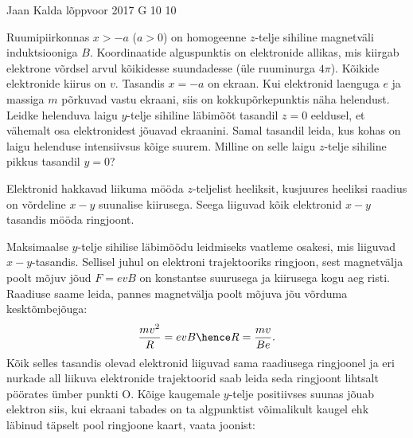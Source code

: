 {Jaan Kalda} %
{lõppvoor} %
{2017} %
{G 10} %
{10} %
{
\ifStatement
Ruumipiirkonnas $x>-a$ ($a>0$) on homogeenne $z$-telje sihiline magnetväli induktsiooniga $B$. 
Koordinaatide alguspunktis on elektronide allikas, mis kiirgab elektrone võrdsel arvul
kõikidesse suundadesse (üle ruuminurga $4\pi$). Kõikide elektronide kiirus on $v$. Tasandis $x=-a$ on ekraan. Kui elektronid 
laenguga $e$ ja massiga $m$ põrkuvad vastu 
ekraani, siis on kokkupõrkepunktis näha helendust. Leidke helenduva laigu $y$-telje sihiline
läbimõõt tasandil $z = 0$ eeldusel, et vähemalt osa elektronidest jõuavad ekraanini.
Samal tasandil leida, kus kohas on laigu helenduse intensiivsus
kõige suurem. Milline on selle laigu $z$-telje sihiline pikkus tasandil $y=0$? 
\fi


\ifHint
Elektronid hakkavad liikuma mööda $z$-teljelist heeliksit, kusjuures heeliksi raadius on võrdeline $x-y$ suunalise kiirusega. Seega liiguvad kõik elektronid $x-y$ tasandis mööda ringjoont.
\fi


\ifSolution
Maksimaalse $y$-telje sihilise läbimõõdu leidmiseks vaatleme osakesi, mis liiguvad $x-y$-tasandis. Sellisel juhul on elektroni trajektooriks ringjoon, sest magnetvälja poolt mõjuv jõud $F=evB$ on konstantse suurusega ja kiirusega kogu aeg risti. Raadiuse saame leida, pannes magnetvälja poolt mõjuva jõu võrduma kesktõmbejõuga:
$$\frac{mv^2}{R}=evB \hence R = \frac{mv}{Be}.$$
Kõik selles tasandis olevad elektronid liiguvad sama raadiusega ringjoonel ja eri nurkade all liikuva elektronide trajektoorid saab leida seda ringjoont lihtsalt pöörates ümber punkti O. Kõige kaugemale $y$-telje positiivses suunas jõuab elektron siis, kui ekraani tabades on ta algpunktist võimalikult kaugel ehk läbinud täpselt pool ringjoone kaart, vaata joonist:
\begin{center}
\end{center}

}
